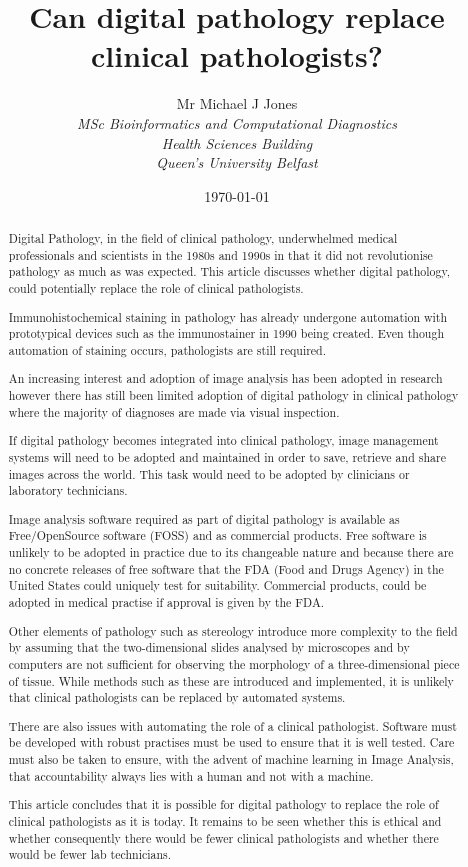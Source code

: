 \documentclass[12pt]{article}
\title{Can digital pathology replace clinical pathologists?} %
\author{
        Mr Michael J Jones \\
                \em{MSc Bioinformatics and Computational Diagnostics}\\
       	Health Sciences Building\\
        Queen's University Belfast
}
\date{\today}
\begin{document}
\maketitle

\begin{abstract}
Digital Pathology, in the field of clinical pathology, underwhelmed medical professionals and scientists in the 1980s and 
1990s in that it did not revolutionise pathology as much as was expected. This article discusses whether digital pathology, 
could potentially replace the role of clinical pathologists.

Immunohistochemical staining in pathology has already undergone automation with prototypical devices such as the 
immunostainer in 1990 being created. Even though automation of staining occurs, pathologists are still required.

An increasing interest and adoption of image analysis has been adopted in research however there has still been limited 
adoption of digital pathology in clinical pathology where the majority of diagnoses are made via visual inspection.

If digital pathology becomes integrated into clinical pathology, image management systems will need to be adopted and 
maintained in order to save, retrieve and share images across the world. This task would need to be adopted by clinicians 
or laboratory technicians.

Image analysis software required as part of digital pathology is available as Free/OpenSource software (FOSS) and as 
commercial products. Free software is unlikely to be adopted in practice due to its changeable nature and because there 
are no concrete releases of free software that the FDA (Food and Drugs Agency) in the United States could uniquely test 
for suitability. Commercial products, could be adopted in medical practise if approval is given by the FDA.

Other elements of pathology such as stereology introduce more complexity to the field by assuming that the two-dimensional 
slides analysed by microscopes and by computers are not sufficient for observing the morphology of a three-dimensional piece 
of tissue. While methods such as these are introduced and implemented, it is unlikely that clinical pathologists can be replaced 
by automated systems.

There are also issues with automating the role of a clinical pathologist. Software must be developed with robust practises 
must be used to ensure that it is well tested. Care must also be taken to ensure, with the advent of machine learning in 
Image Analysis, that accountability always lies with a human and not with a machine.

This article concludes that it is possible for digital pathology to replace the role of clinical pathologists as it is today. It remains to 
be seen whether this is ethical and whether consequently there would be fewer clinical pathologists and whether there would be 
fewer lab technicians.

\end{abstract}
\end{document}
